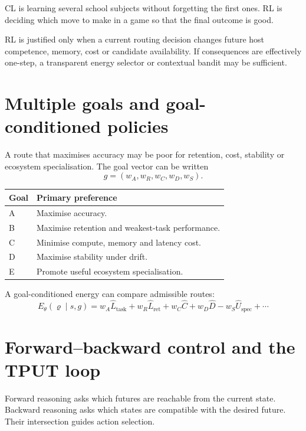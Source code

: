 \documentclass[11pt,a4paper]{article}
\newcommand{\tablehead}[1]{\cellcolor{DeepTeal}\color{white}\bfseries #1}
\begin{document}
\begin{twelvebox}
CL is learning several school subjects without forgetting the first ones. RL is deciding which move to make in a game so that the final outcome is good.
\end{twelvebox}

\begin{researchbox}
RL is justified only when a current routing decision changes future host competence, memory, cost or candidate availability. If consequences are effectively one-step, a transparent energy selector or contextual bandit may be sufficient.
\end{researchbox}

\section{Multiple goals and goal-conditioned policies}

A route that maximises accuracy may be poor for retention, cost, stability or ecosystem specialisation. The goal vector can be written
\[
g=(w_A,w_R,w_C,w_D,w_S).
\]

\begin{tabularx}{\textwidth}{p{2.2cm}X}
\toprule
\tablehead{Goal} & \tablehead{Primary preference}\\
\midrule
A & Maximise accuracy.\\
B & Maximise retention and weakest-task performance.\\
C & Minimise compute, memory and latency cost.\\
D & Maximise stability under drift.\\
E & Promote useful ecosystem specialisation.\\
\bottomrule
\end{tabularx}

A goal-conditioned energy can compare admissible routes:
\[
E_\theta(\varrho\mid s,g)=
 w_A\widehat L_{\mathrm{task}}+w_R\widehat L_{\mathrm{ret}}+w_C\widehat C
 +w_D\widehat D-w_S\widehat U_{\mathrm{spec}}+\cdots
\]

\newpage
\section{Forward--backward control and the TPUT loop}

Forward reasoning asks which futures are reachable from the current state. Backward reasoning asks which states are compatible with the desired future. Their intersection guides action selection.
\end{document}
